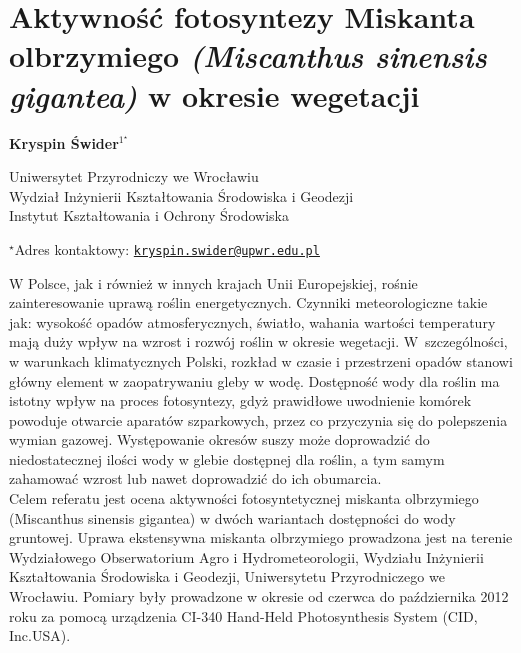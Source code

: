 \documentclass[\main/boa.tex]{subfiles}
\begin{document}
\section{Aktywność fotosyntezy Miskanta olbrzymiego \emph{(Miscanthus sinensis gigantea)} w okresie wegetacji}

\begin{center}
  {\bf {} Kryspin \'Swider$^{1^\star}$}
\end{center}

\vskip 0.3cm

\begin{affiliations}
\begin{enumerate}
\begin{minipage}{0.915\textwidth}
\centering
\item  Uniwersytet Przyrodniczy we Wrocławiu\\ Wydział Inżynierii Kształtowania Środowiska i Geodezji\\ Instytut Kształtowania i Ochrony Środowiska
\end{minipage}
\end{enumerate}
$^\star$Adres kontaktowy: \href{mailto:kryspin.swider@upwr.edu.pl}{\nolinkurl{kryspin.swider@upwr.edu.pl}}\\
\end{affiliations}

\vskip 0.5cm


\vskip 0.5cm

W Polsce, jak i również w innych krajach Unii Europejskiej, rośnie zainteresowanie uprawą roślin energetycznych. Czynniki meteorologiczne takie jak: wysokość opadów atmosferycznych, światło, wahania wartości temperatury mają duży wpływ na wzrost i rozwój roślin w okresie wegetacji. W~szczególności, w warunkach klimatycznych Polski, rozkład w czasie i przestrzeni opadów stanowi główny element w zaopatrywaniu gleby w wodę. Dostępność wody dla roślin ma istotny wpływ na proces fotosyntezy, gdyż prawidłowe uwodnienie komórek powoduje otwarcie aparatów szparkowych, przez co przyczynia się do polepszenia wymian gazowej. Występowanie okresów suszy może doprowadzić do niedostatecznej ilości wody w glebie dostępnej dla roślin, a tym samym zahamować wzrost lub nawet doprowadzić do ich obumarcia.\\
Celem referatu jest ocena aktywności fotosyntetycznej miskanta olbrzymiego (Miscanthus sinensis gigantea) w dwóch wariantach dostępności do wody gruntowej. Uprawa ekstensywna miskanta olbrzymiego prowadzona jest na terenie Wydziałowego Obserwatorium Agro i Hydrometeorologii, Wydziału Inżynierii Kształtowania Środowiska i Geodezji, Uniwersytetu Przyrodniczego we Wrocławiu. Pomiary były prowadzone w okresie od czerwca do października 2012 roku za pomocą urządzenia CI-340 Hand-Held Photosynthesis System (CID, Inc.USA). 
\end{document}
